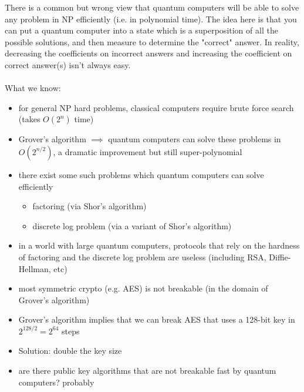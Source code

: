 There is a common but wrong view that quantum computers will be able to solve any problem in NP efficiently (i.e. in polynomial time). The idea here is that you can put a quantum computer into a state which is a superposition of all the possible solutions, and then measure to determine the "correct" answer. In reality, decreasing the coefficients on incorrect answers and increasing the coefficient on correct answer(s) isn't always easy. 
\\
\\
What we know:
\begin{itemize}
	\item for general NP hard problems, classical computers require brute force search (takes $O(2^n)$ time)
	\item Grover's algorithm $\implies$ quantum computers can solve these problems in $O(2^{n/2})$, a dramatic improvement but still super-polynomial
	\item there exist some such problems which quantum computers can solve efficiently
		\begin{itemize}
			\item factoring (via Shor's algorithm)
			\item discrete log problem (via a variant of Shor's algorithm)
		\end{itemize}
\end{itemize}

\begin{itemize}
	\item in a world with large quantum computers, protocols that rely on the hardness of factoring and the discrete log problem are useless (including RSA, Diffie-Hellman, etc)
	\item most symmetric crypto (e.g. AES) is not breakable (in the domain of Grover's algorithm)
	\item Grover's algorithm implies that we can break AES that uses a 128-bit key in $2^{128/2} = 2^64$ steps
	\item Solution: double the key size
	\item are there public key algorithms that are not breakable fast by quantum computers? probably
\end{itemize}

